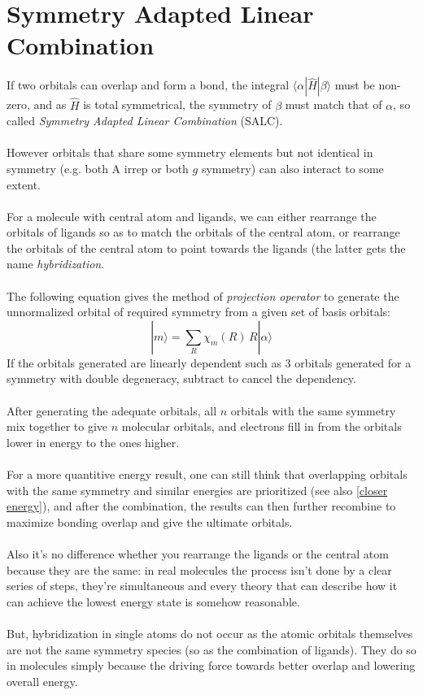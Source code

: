 	\section{Symmetry Adapted Linear Combination}\label{salc}
	
		If two orbitals can overlap and form a bond, the integral $\langle \alpha | \hat{H} | \beta \rangle$ must be non-zero, 
		and as $\hat{H}$ is total symmetrical, the symmetry of $\beta$ must match that of $\alpha$, 
		so called \emph{Symmetry Adapted Linear Combination} (SALC). \\ \\
		However orbitals that share some symmetry elements but not identical in symmetry (e.g. both A irrep or both $g$ symmetry) 
		can also interact to some extent.\\\ \\
		For a molecule with central atom and ligands, we can either rearrange the orbitals of ligands so as to match the orbitals of the central atom, 
		or rearrange the orbitals of the central atom to point towards the ligands (the latter gets the name \emph{hybridization}.\\\ \\
		The following equation gives the method of \emph{projection operator} to generate the unnormalized orbital of required symmetry from a given set of basis orbitals:
		\[\boxed{| m \rangle = \sum_{R}^{\ }\chi_{m}(R)\,R|\alpha\rangle}\]
		If the orbitals generated are linearly dependent such as 3 orbitals generated for a symmetry with double degeneracy, 
		subtract to cancel the dependency.\\\ \\
		After generating the adequate orbitals, all $n$ orbitals with the same symmetry mix together to give $n$ molecular orbitals, 
		and electrons fill in from the orbitals lower in energy to the ones higher.\\ \\
		For a more quantitive energy result, one can still think that 
		overlapping orbitals with the same symmetry and similar energies are prioritized (see also \ref{closer energy}), 
		and after the combination, the results can then further recombine to maximize bonding overlap and give the ultimate orbitals.\\ \\
		Also it's no difference whether you rearrange the ligands or the central atom because they are the same: 
		in real molecules the process isn't done by a clear series of steps, 
		they're simultaneous and every theory that can describe how it can achieve the lowest energy state is somehow reasonable.\\\ \\  
		But, hybridization in single atoms do not occur as the atomic orbitals themselves are not the same symmetry species 
		(so as the combination of ligands). 
		They do so in molecules simply because the driving force towards better overlap and lowering overall energy.
		
